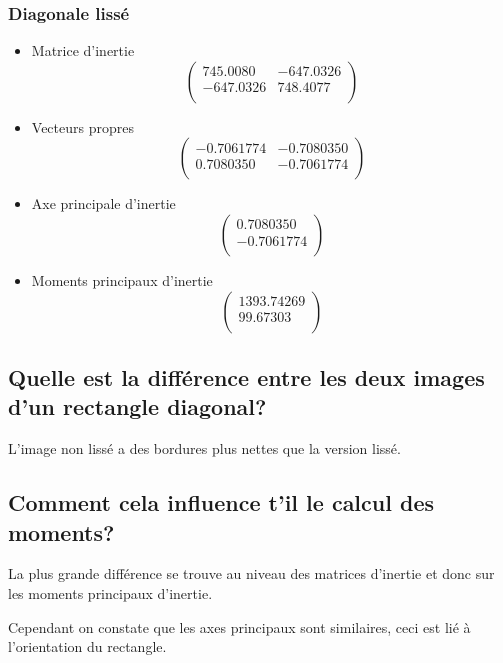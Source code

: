 \documentclass[a4paper,12pt]{report}
\begin{document}
\subsubsection*{Diagonale lissé}
\begin{itemize}
\item Matrice d'inertie 
\[
   \left (
   \begin{array}{cc}
      745.0080 & -647.0326\\
      -647.0326 & 748.4077 \\
   \end{array}
   \right )
\]
\item Vecteurs propres
\[
   \left (
   \begin{array}{cc}
      -0.7061774 & -0.7080350  \\
      0.7080350 & -0.7061774 \\
   \end{array}
   \right )
\]

\item Axe principale d'inertie
\[
   \left (
   \begin{array}{c}
      0.7080350 \\
      -0.7061774 \\
   \end{array}
   \right )
\]

\item Moments principaux d'inertie
\[
   \left (
   \begin{array}{c}
      1393.74269 \\
      99.67303 \\
   \end{array}
   \right )
\]

\end{itemize}

\subsection*{Quelle est la différence entre les deux images d'un rectangle diagonal?}
L'image non lissé a des bordures plus nettes que la version lissé.

\subsection*{Comment cela influence t'il le calcul des moments?}
La plus grande différence se trouve au niveau des matrices d'inertie et donc sur les moments principaux d'inertie.

Cependant on constate que les axes principaux sont similaires, ceci est lié à l'orientation du rectangle.
\end{document}
